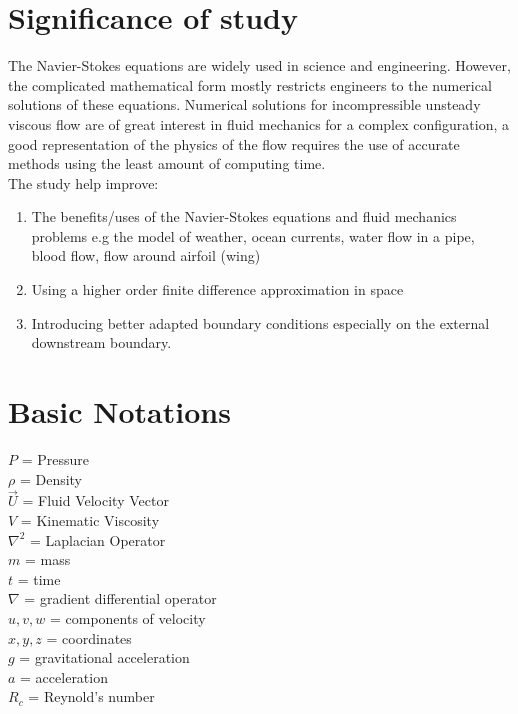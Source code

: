 \documentclass[11pt]{report}
\newcommand{\NI}{\noindent}
\begin{document}
	\section{Significance of study}
	The Navier-Stokes equations are widely used in science and engineering. However, the complicated mathematical form mostly restricts engineers to the numerical solutions of these equations. Numerical solutions for incompressible unsteady viscous flow are of great interest in fluid mechanics for a complex configuration, a good representation of the physics of the flow requires the use of accurate methods using the least amount of computing time. \\
	
	\NI The study help improve:
	\begin{enumerate}
		\item The benefits/uses of the Navier-Stokes equations and fluid mechanics problems e.g the model of weather, ocean currents, water flow in a pipe, blood flow, flow around airfoil (wing)
		
		\item Using a higher order finite difference approximation in space
		
		\item Introducing better adapted boundary conditions especially on the external downstream boundary.
	\end{enumerate}
	

	\section{Basic Notations}
	$P$ = Pressure\\
	$\rho$ = Density \\
	$\vec{U}$ = Fluid Velocity Vector\\
	$V$ = Kinematic Viscosity\\
	$\nabla^2$ = Laplacian Operator\\
	$m$ = mass\\
	$t$ = time\\
	$\nabla$ = gradient differential operator\\
	$u,v,w$ = components of velocity\\
	$x,y,z$ = coordinates\\
	$g$ = gravitational acceleration\\
	$a$ = acceleration\\
	$R_c$ = Reynold's number

	
\end{document}
